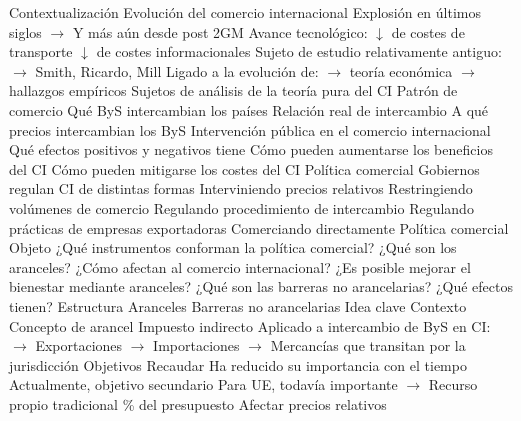 \documentclass{nuevotema}
\begin{document}
\esquemalargo






















\begin{esquemal}
	\1[] 
		\2 Contextualización
			\3 Evolución del comercio internacional
				\4 Explosión en últimos siglos
				\4[] $\to$ Y más aún desde post 2GM
				\4 Avance tecnológico:
				\4[] $\downarrow$ de costes de transporte
				\4[] $\downarrow$ de costes informacionales
				\4 Sujeto de estudio relativamente antiguo:
				\4[] $\to$ Smith, Ricardo, Mill
				\4[] Ligado a la evolución de:
				\4[] $\to$ teoría económica
				\4[] $\to$ hallazgos empíricos
			\3 Sujetos de análisis de la teoría pura del CI
				\4 Patrón de comercio
				\4[] Qué ByS intercambian los países
				\4 Relación real de intercambio
				\4[] A qué precios intercambian los ByS
				\4 Intervención pública en el comercio internacional
				\4[] Qué efectos positivos y negativos tiene
				\4[] Cómo pueden aumentarse los beneficios del CI
				\4[] Cómo pueden mitigarse los costes del CI
			\3 Política comercial
				\4 Gobiernos regulan CI de distintas formas
				\4[] Interviniendo precios relativos
				\4[] Restringiendo volúmenes de comercio
				\4[] Regulando procedimiento de intercambio
				\4[] Regulando prácticas de empresas exportadoras
				\4[] Comerciando directamente
				\4[$\then$] Política comercial
		\2 Objeto
			\3 ¿Qué instrumentos conforman la política comercial?
			\3 ¿Qué son los aranceles?
			\3 ¿Cómo afectan al comercio internacional?
			\3 ¿Es posible mejorar el bienestar mediante aranceles?
			\3 ¿Qué son las barreras no arancelarias?
			\3 ¿Qué efectos tienen?
		\2 Estructura
			\3 Aranceles
			\3 Barreras no arancelarias
	\1 
		\2 Idea clave
			\3 Contexto
				\4 Concepto de arancel
				\4[] Impuesto indirecto
				\4[]  Aplicado a intercambio de ByS en CI:
				\4[] $\to$ Exportaciones
				\4[] $\to$ Importaciones
				\4[] $\to$ Mercancías que transitan por la jurisdicción
			\3 Objetivos
				\4 Recaudar
				\4[] Ha reducido su importancia con el tiempo
				\4[] Actualmente, objetivo secundario
				\4[] Para UE, todavía importante
				\4[] $\to$ Recurso propio tradicional
				\% del presupuesto
				\4 Afectar precios relativos

\end{esquemal}
\end{document}
